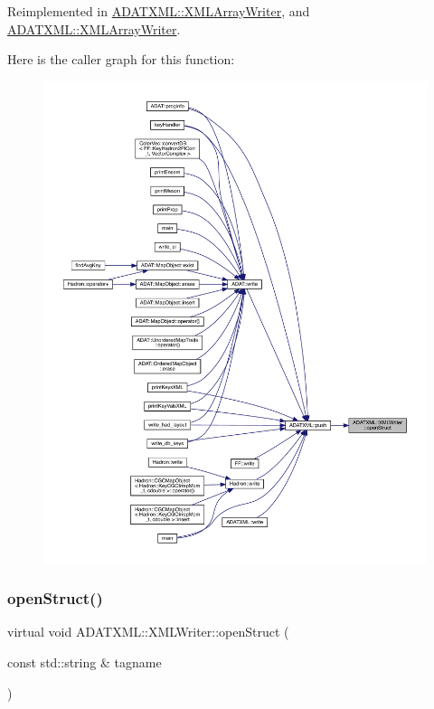 Reimplemented in \mbox{\hyperlink{classADATXML_1_1XMLArrayWriter_af1602cb14d54aa8e42442f2784c00e22}{A\+D\+A\+T\+X\+M\+L\+::\+X\+M\+L\+Array\+Writer}}, and \mbox{\hyperlink{classADATXML_1_1XMLArrayWriter_af1602cb14d54aa8e42442f2784c00e22}{A\+D\+A\+T\+X\+M\+L\+::\+X\+M\+L\+Array\+Writer}}.

Here is the caller graph for this function\+:\nopagebreak
\begin{figure}[H]
\begin{center}
\leavevmode
\includegraphics[width=350pt]{da/da7/classADATXML_1_1XMLWriter_a8f9728743acfd9c15ab5d69bf8800a5e_icgraph}
\end{center}
\end{figure}
\mbox{\label{classADATXML_1_1XMLWriter_a8f9728743acfd9c15ab5d69bf8800a5e}} 
\subsubsection{\texorpdfstring{openStruct()}{openStruct()}\hspace{0.1cm}{\footnotesize\ttfamily [2/2]}}
{\footnotesize\ttfamily virtual void A\+D\+A\+T\+X\+M\+L\+::\+X\+M\+L\+Writer\+::open\+Struct (\begin{DoxyParamCaption}\item[{const std\+::string \&}]{tagname }\end{DoxyParamCaption})\hspace{0.3cm}{\ttfamily [virtual]}}



